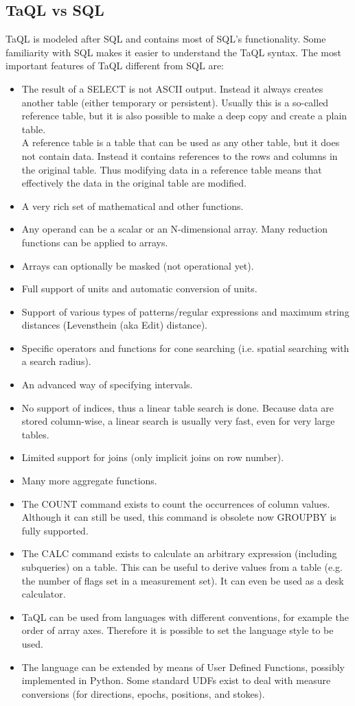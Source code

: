 \subsection{TaQL vs SQL}
TaQL is modeled after SQL and contains most of SQL's
functionality. Some familiarity with SQL makes it easier to understand
the TaQL syntax.
The most important features of TaQL different from SQL are:
\begin{itemize}
\item The result of a SELECT is not ASCII output. Instead it always
creates another table (either temporary or persistent). Usually this
is a so-called reference table, but it is also possible to make a deep
copy and create a plain table.
\\A reference table is a table that can be used as any other table,
but it does not contain data. Instead it contains references to the
rows and columns in the original table. Thus modifying data in a
reference table means that effectively the data in the original
table are modified.
\item A very rich set of mathematical and other functions.
\item Any operand can be a scalar or an N-dimensional array.
Many reduction functions can be applied to arrays.
\item Arrays can optionally be masked (not operational yet).
\item Full support of units and automatic conversion of units.
\item Support of various types of patterns/regular expressions and
maximum string distances (Levensthein (aka Edit) distance).
\item Specific operators and functions for cone searching
(i.e. spatial searching with a search radius).
\item An advanced way of specifying intervals.
\item No support of indices, thus a linear table search is done.
Because data are stored column-wise, a linear search is usually very
 fast, even for very large tables.
\item Limited support for joins (only implicit joins on row number).
\item Many more aggregate functions.
\item The COUNT command exists to count the occurrences of column
  values. Although it can still be used, this command is obsolete now 
  GROUPBY is fully supported.
\item The CALC command exists to
calculate an arbitrary expression (including subqueries) on a
table. This can be useful to derive values from a table (e.g. the
number of flags set in a measurement set). It can even be used as a
desk calculator.
\item TaQL can be used from languages with different conventions, for
example the order of array axes. Therefore it is possible to set the
language style to be used.
\item The language can be extended by means of User Defined
  Functions, possibly implemented in Python.
  Some standard UDFs exist to deal with measure conversions
  (for directions, epochs, positions, and stokes).
\end{itemize}
